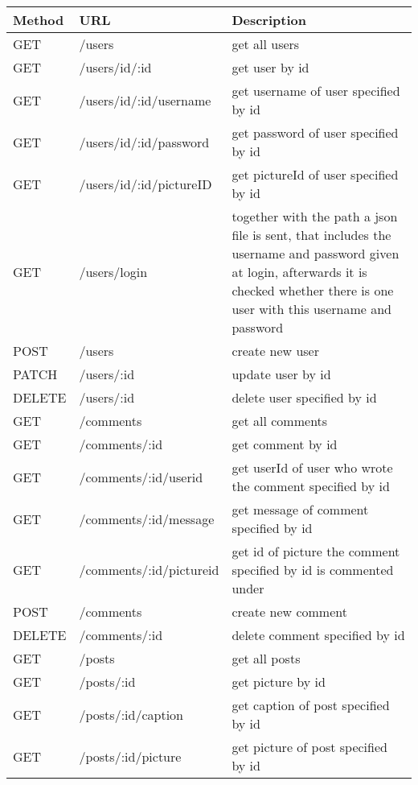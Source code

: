 \begin{table}[!htb]
\begin{tabularx}{\textwidth}{|x|X|X|}
    \hline
    \textbf{Method} & \textbf{URL} & \textbf{Description} \\
    \hline
    \hline
    GET & /users & get all users\\
    \hline
    GET & /users/id/:id & get user by id\\
    \hline
    GET & /users/id/:id/username & get username of user specified by id\\
    \hline 
    GET & /users/id/:id/password & get password of user specified by id\\
    \hline
    GET & /users/id/:id/pictureID & get pictureId of user specified by id\\
    \hline
    GET & /users/login & together with the path a json file is sent, that includes the username and password given at login, afterwards it is checked whether there is one user with this username and password\\
    \hline
    POST & /users & create new user\\
    \hline
    PATCH & /users/:id & update user by id\\
    \hline
    DELETE & /users/:id & delete user specified by id\\
    \hline
    \hline
    GET & /comments & get all comments\\
    \hline
    GET & /comments/:id & get comment by id\\
    \hline
    GET & /comments/:id/userid & get userId of user who wrote the comment specified by id\\
    \hline
    GET & /comments/:id/message & get message of comment specified by id\\
    \hline
    GET & /comments/:id/pictureid & get id of picture the comment specified by id is commented under\\
    \hline
    POST & /comments & create new comment\\
    \hline
    DELETE & /comments/:id & delete comment specified by id\\
    \hline
    \hline
    GET & /posts & get all posts\\
    \hline
    GET & /posts/:id & get picture by id\\
    \hline
    GET & /posts/:id/caption & get caption of post specified by id\\
    \hline
    GET & /posts/:id/picture & get picture of post specified by id\\

\end{tabularx}
\end{table}

